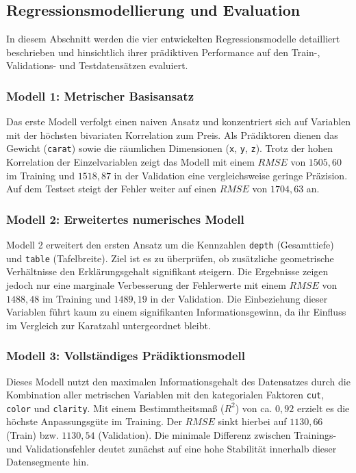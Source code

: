 \subsection{Regressionsmodellierung und Evaluation}
In diesem Abschnitt werden die vier entwickelten Regressionsmodelle detailliert beschrieben und hinsichtlich ihrer prädiktiven Performance auf den Train-, Validations- und Testdatensätzen evaluiert.

\subsubsection{Modell 1: Metrischer Basisansatz}
Das erste Modell verfolgt einen naiven Ansatz und konzentriert sich auf Variablen mit der höchsten bivariaten Korrelation zum Preis. Als Prädiktoren dienen das Gewicht (\texttt{carat}) sowie die räumlichen Dimensionen (\texttt{x}, \texttt{y}, \texttt{z}). Trotz der hohen Korrelation der Einzelvariablen zeigt das Modell mit einem $RMSE$ von $1505,60$ im Training und $1518,87$ in der Validation eine vergleichsweise geringe Präzision. Auf dem Testset steigt der Fehler weiter auf einen $RMSE$ von $1704,63$ an.

\subsubsection{Modell 2: Erweitertes numerisches Modell}
Modell 2 erweitert den ersten Ansatz um die Kennzahlen \texttt{depth} (Gesamttiefe) und \texttt{table} (Tafelbreite). Ziel ist es zu überprüfen, ob zusätzliche geometrische Verhältnisse den Erklärungsgehalt signifikant steigern. Die Ergebnisse zeigen jedoch nur eine marginale Verbesserung der Fehlerwerte mit einem $RMSE$ von $1488,48$ im Training und $1489,19$ in der Validation. Die Einbeziehung dieser Variablen führt kaum zu einem signifikanten Informationsgewinn, da ihr Einfluss im Vergleich zur Karatzahl untergeordnet bleibt.

\subsubsection{Modell 3: Vollständiges Prädiktionsmodell}
Dieses Modell nutzt den maximalen Informationsgehalt des Datensatzes durch die Kombination aller metrischen Variablen mit den kategorialen Faktoren \texttt{cut}, \texttt{color} und \texttt{clarity}. Mit einem Bestimmtheitsmaß ($R^2$) von ca. $0,92$ erzielt es die höchste Anpassungsgüte im Training. Der $RMSE$ sinkt hierbei auf $1130,66$ (Train) bzw. $1130,54$ (Validation). Die minimale Differenz zwischen Trainings- und Validationsfehler deutet zunächst auf eine hohe Stabilität innerhalb dieser Datensegmente hin.

